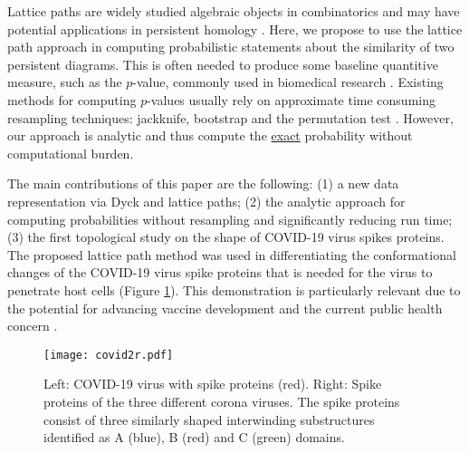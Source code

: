 \documentclass{llncs}
\begin{document}
Lattice paths are widely studied algebraic objects in combinatorics and may have potential applications in persistent homology \cite{billera.2001,chung.2019.NN,simion.2000,stanley.1999}. Here, we propose to use the lattice path approach in computing probabilistic statements about the similarity of two persistent diagrams. This is often needed to produce some baseline quantitive measure, such as the $p$-value, commonly used in biomedical research \cite{chazal.2013,chung.2019.NN}. Existing methods for computing $p$-values usually rely on approximate time consuming resampling techniques: jackknife, bootstrap and the permutation test \cite{ahmed.2014,chung.2019.NN}. However, our approach is analytic and  thus compute the \underline{exact} probability without computational burden.

The main contributions of this paper are the following: (1) a new data representation via Dyck and lattice paths; (2) the analytic approach for computing probabilities without resampling and significantly reducing run time;  (3) the first topological study on the shape of COVID-19 virus spikes proteins. The proposed lattice path method was used in differentiating the conformational changes of the COVID-19 virus spike proteins that is needed for the virus  to penetrate host cells (Figure \ref{fig:covid}). This demonstration is particularly relevant due to the potential for advancing vaccine development and the current public health concern \cite{walls.2020,cai.2020}. 


 \begin{figure}[t]
\center
  \texttt{[image: covid2r.pdf]}
  \caption{\small Left: COVID-19 virus with spike proteins (red). Right: Spike proteins of the three different corona viruses. The spike proteins consist of three similarly shaped interwinding substructures identified as A (blue), B (red) and C (green) domains.}
  \label{fig:covid}
\end{figure}
\end{document}
